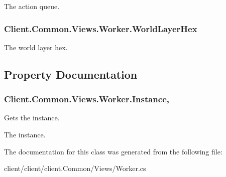 The action queue. 

\hypertarget{classClient_1_1Common_1_1Views_1_1Worker_ad93fe39b0876e5f1d7673e657364740d}{}
\subsubsection[{World\+Layer\+Hex}]{ Client.\+Common.\+Views.\+Worker.\+World\+Layer\+Hex}\label{classClient_1_1Common_1_1Views_1_1Worker_ad93fe39b0876e5f1d7673e657364740d}


The world layer hex. 



\subsection{Property Documentation}
\hypertarget{classClient_1_1Common_1_1Views_1_1Worker_a870b696110e6d83f21533e3ee250ef1a}{}
\subsubsection[{Instance}]{ Client.\+Common.\+Views.\+Worker.\+Instance\hspace{0.3cm}{\ttfamily [static]}, {\ttfamily [get]}}\label{classClient_1_1Common_1_1Views_1_1Worker_a870b696110e6d83f21533e3ee250ef1a}


Gets the instance. 

The instance.

The documentation for this class was generated from the following file\+:\begin{DoxyCompactItemize}
\item 
client/client/client.\+Common/\+Views/Worker.\+cs\end{DoxyCompactItemize}
